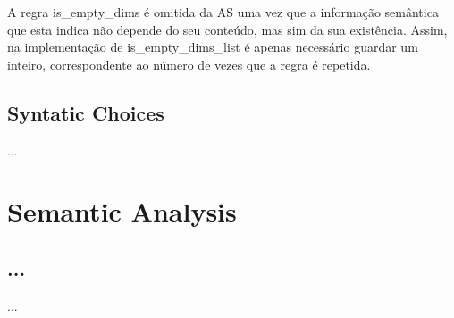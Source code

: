 \documentclass[a4paper]{article}
\begin{document}
A regra is\_empty\_dims é omitida da AS uma vez que a informação semântica que esta indica não depende do seu conteúdo, mas sim da sua existência.
Assim, na implementação de is\_empty\_dims\_list é apenas necessário guardar um inteiro, correspondente ao número de vezes que a regra é repetida.

\subsection{Syntatic Choices}
\indent \indent ...

\cleardoublepage

\section{Semantic Analysis}
\subsection{...}
\indent \indent ...
\end{document}
